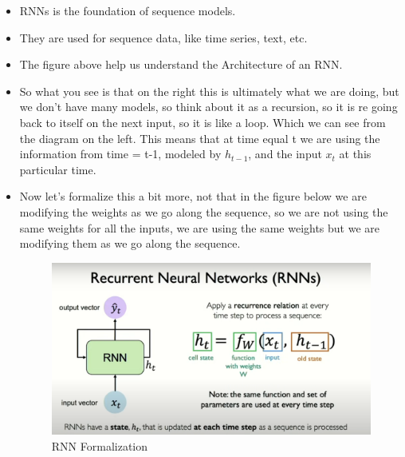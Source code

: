 \documentclass{article}
\begin{document}
\begin{itemize}
  \item RNNs is the foundation of sequence models.
  \item They are used for sequence data, like time series, text, etc.
  \item The figure above help us understand the Architecture of an RNN.
  \item So what you see is that on the right this is ultimately what we are doing, but we don't have many models, so think about it as a recursion, so it is re going back to itself on the next input, so it is like a loop. Which we can see from the diagram on the left. This means that at time equal t we are using the information from time = t-1, modeled by $h_{t-1}$, and the input $x_t$ at this particular time.
  \item Now let's formalize this a bit more, not that in the figure below we are modifying the weights as we go along the sequence, so we are not using the same weights for all the inputs, we are using the same weights but we are modifying them as we go along the sequence.
  
  \begin{figure}[H]
    \centering
    \includegraphics[width = \textwidth]{Images/rnn2.png}
    \caption{RNN Formalization}
  \end{figure}


\end{itemize}
\end{document}
